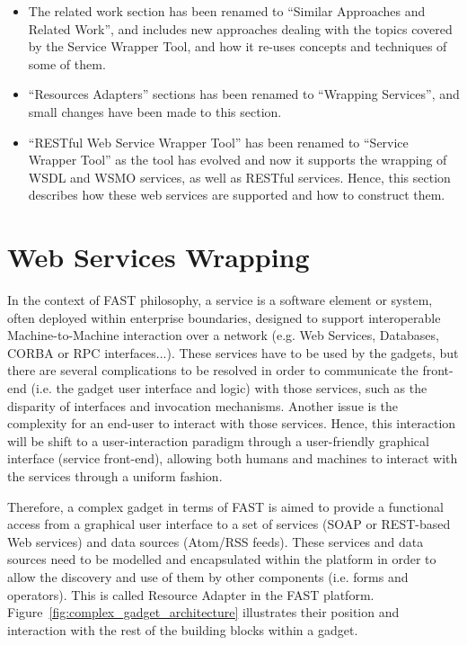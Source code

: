 \documentclass{fast_latex}
\begin{document}
\begin{itemize}
 \item The related work section has been renamed to ``Similar Approaches and Related Work'', and includes new approaches dealing with the topics covered by the Service Wrapper Tool, and how it re-uses concepts and techniques of some of them.
 \item ``Resources Adapters'' sections has been renamed to ``Wrapping Services'', and small changes have been made to this section.
 \item ``RESTful Web Service Wrapper Tool'' has been renamed to ``Service Wrapper Tool'' as the tool has evolved and now it supports the wrapping of WSDL and WSMO services, as well as RESTful services. Hence, this section describes how these web services are supported and how to construct them.
\end{itemize}



\clearpage
\section{Web Services Wrapping} %
\label{sec:web_services_wrapping}

In the context of FAST philosophy, a service is a software element or system, often deployed within enterprise boundaries, designed to support interoperable Machine-to-Machine interaction over a network (e.g. Web Services, Databases, CORBA or RPC interfaces...). These services have to be used by the gadgets, but there are several complications to be resolved in order to communicate the front-end (i.e. the gadget user interface and logic) with those services, such as the disparity of interfaces and invocation mechanisms. Another issue is the complexity for an end-user to interact with those services. Hence, this interaction will be shift to a user-interaction paradigm through a user-friendly graphical interface (service front-end), allowing both humans and machines to interact with the services through a uniform fashion.

Therefore, a complex gadget in terms of FAST is aimed to provide a functional access from a graphical user interface to a set of services (SOAP or REST-based Web services) and data sources (Atom/RSS feeds). These services and data sources need to be modelled and encapsulated within the platform in order to allow the discovery and use of them by other components (i.e. forms and operators). This is called Resource Adapter in the FAST platform. Figure~\ref{fig:complex_gadget_architecture} illustrates their position and interaction with the rest of the building blocks within a gadget.
\end{document}
